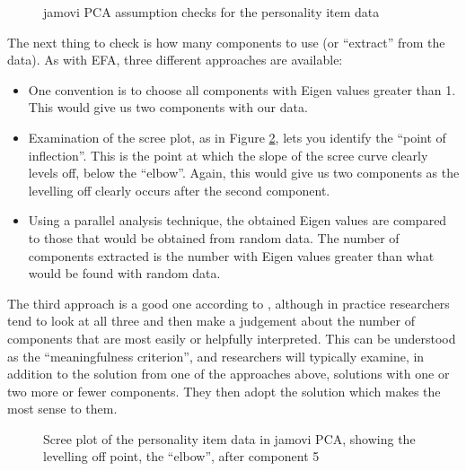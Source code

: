 \begin{figure}[p]
\begin{center}
\caption{jamovi PCA assumption checks for the personality item data}
\label{fig:pca2}
\HR
\end{center}
\end{figure}

The next thing to check is how many components to use (or “extract” from the data). As with EFA, three different approaches are available:

\begin{itemize}
\item One convention is to choose all components with Eigen values greater than 1. This would give us two components with our data. 
\item Examination of the scree plot, as in Figure \ref{fig:pca3}, lets you identify the “point of inflection”. This is the point at which the slope of the scree curve clearly levels off, below the “elbow”. Again, this would give us two components as the levelling off clearly occurs after the second component. 
\item Using a parallel analysis technique, the obtained Eigen values are compared to those that would be obtained from random data. The number of components extracted is the number with Eigen values greater than what would be found with random data. 
\end{itemize}

The third approach is a good one according to \textcite{Fabrigar1999}, although in practice researchers tend to look at all three and then make a judgement about the number of components that are most easily or helpfully interpreted. This can be understood as the ``meaningfulness criterion'', and researchers will typically examine, in addition to the solution from one of the approaches above, solutions with one or two more or fewer components. They then adopt the solution which makes the most sense to them.

\begin{figure}[!htb]
\begin{center}
\caption{Scree plot of the personality item data in jamovi PCA, showing the levelling off point, the “elbow”, after component 5}
\label{fig:pca3}
\HR
\end{center}
\end{figure}

